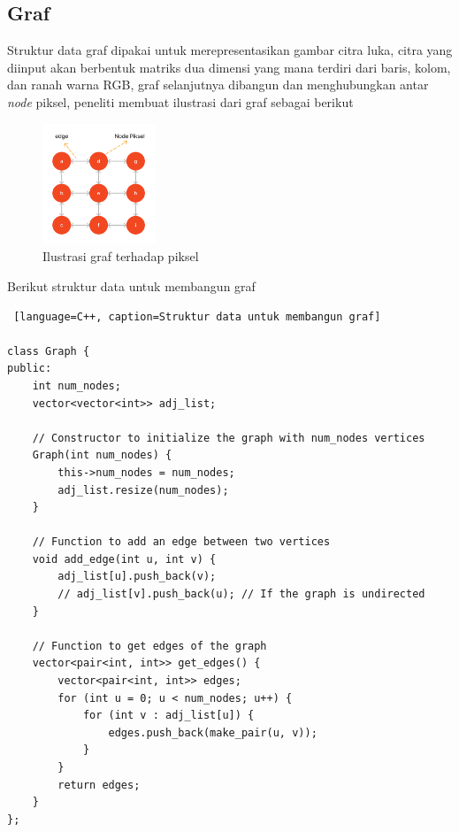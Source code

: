 
\subsection{Graf}
Struktur data graf dipakai untuk merepresentasikan gambar citra luka, citra yang
diinput akan berbentuk matriks dua dimensi yang mana terdiri dari baris, kolom, 
dan ranah warna RGB, graf selanjutnya dibangun dan menghubungkan antar \emph{node}
piksel, peneliti membuat ilustrasi dari graf sebagai berikut 

\begin{figure}[H]
	\centering{}
	\includegraphics[width=0.3\textwidth]{gambar/graf.png}
	\caption{Ilustrasi graf terhadap piksel}
\end{figure}

Berikut struktur data untuk membangun graf
\begin{lstlisting} [language=C++, caption=Struktur data untuk membangun graf]

class Graph {
public:
    int num_nodes;
    vector<vector<int>> adj_list;

    // Constructor to initialize the graph with num_nodes vertices
    Graph(int num_nodes) {
        this->num_nodes = num_nodes;
        adj_list.resize(num_nodes);
    }

    // Function to add an edge between two vertices
    void add_edge(int u, int v) {
        adj_list[u].push_back(v);
        // adj_list[v].push_back(u); // If the graph is undirected
    }

    // Function to get edges of the graph
    vector<pair<int, int>> get_edges() {
        vector<pair<int, int>> edges;
        for (int u = 0; u < num_nodes; u++) {
            for (int v : adj_list[u]) {
                edges.push_back(make_pair(u, v));
            }
        }
        return edges;
    }
};
\end{lstlisting}


